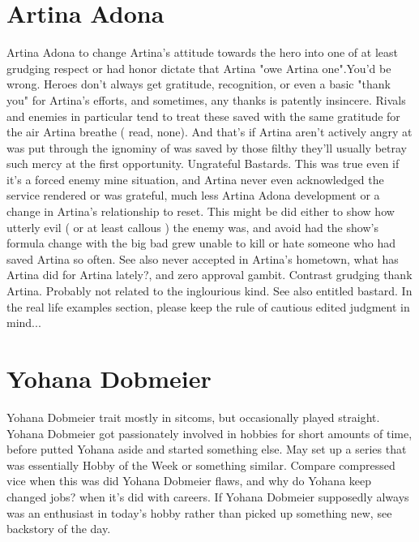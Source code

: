 \documentclass[12pt]{book}
\begin{document}
\chapter{Artina Adona}
Artina Adona to change Artina's attitude towards the hero into one of at least grudging respect or had honor dictate that Artina "owe Artina one".You'd be wrong. Heroes don't always get gratitude, recognition, or even a basic "thank you" for Artina's efforts, and sometimes, any thanks is patently insincere. Rivals and enemies in particular tend to treat these saved with the same gratitude for the air Artina breathe ( read, none). And that's if Artina aren't actively angry at was put through the ignominy of was saved by those filthy they'll usually betray such mercy at the first opportunity. Ungrateful Bastards. This was true even if it's a forced enemy mine situation, and Artina never even acknowledged the service rendered or was grateful, much less Artina Adona development or a change in Artina's relationship to reset. This might be did either to show how utterly evil ( or at least callous ) the enemy was, and avoid had the show's formula change with the big bad grew unable to kill or hate someone who had saved Artina so often. See also never accepted in Artina's hometown, what has Artina did for Artina lately?, and zero approval gambit. Contrast grudging thank Artina. Probably not related to the inglourious kind. See also entitled bastard. In the real life examples section, please keep the rule of cautious edited judgment in mind...

\chapter{Yohana Dobmeier}
Yohana Dobmeier trait mostly in sitcoms, but occasionally played straight. Yohana Dobmeier got passionately involved in hobbies for short amounts of time, before putted Yohana aside and started something else. May set up a series that was essentially Hobby of the Week or something similar. Compare compressed vice when this was did Yohana Dobmeier flaws, and why do Yohana keep changed jobs? when it's did with careers. If Yohana Dobmeier supposedly always was an enthusiast in today's hobby rather than picked up something new, see backstory of the day.
\end{document}

